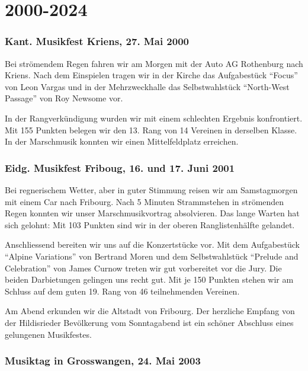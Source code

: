 \section*{2000-2024}

\begin{history}

    \subsubsection*{Kant. Musikfest Kriens, 27. Mai 2000}

    Bei strömendem Regen fahren wir am Morgen mit der Auto AG Rothenburg nach
    Kriens. Nach dem Einspielen tragen wir in der Kirche das Aufgabestück
    \enquote{Focus} von Leon Vargas und in der Mehrzweckhalle das
    Selbstwahlstück \enquote{North-West Passage} von Roy Newsome vor.

    In der Rangverkündigung wurden wir mit einem schlechten Ergebnis
    konfrontiert. Mit 155 Punkten belegen wir den 13. Rang von 14 Vereinen in
    derselben Klasse. In der Marschmusik konnten wir einen Mittelfeldplatz
    erreichen.


    \subsubsection*{Eidg. Musikfest Friboug, 16. und 17. Juni 2001}

    Bei regnerischem Wetter, aber in guter Stimmung reisen wir am Samstagmorgen
    mit einem Car nach Fribourg. Nach 5 Minuten Strammstehen in strömenden Regen
    konnten wir unser Marschmusikvortrag absolvieren. Das lange Warten hat sich
    gelohnt: Mit 103 Punkten sind wir in der oberen Ranglistenhälfte gelandet.

    Anschliessend bereiten wir uns auf die Konzertstücke vor. Mit dem
    Aufgabestück \enquote{Alpine Variations} von Bertrand Moren und dem
    Selbstwahlstück \enquote{Prelude and Celebration} von James Curnow treten
    wir gut vorbereitet vor die Jury. Die beiden Darbietungen gelingen uns recht
    gut. Mit je 150 Punkten stehen wir am Schluss auf dem guten 19. Rang von 46
    teilnehmenden Vereinen.

    Am Abend erkunden wir die Altstadt von Fribourg. Der herzliche Empfang von
    der Hildisrieder Bevölkerung vom Sonntagabend ist ein schöner Abschluss
    eines gelungenen Musikfestes.


    \subsubsection*{Musiktag in Grosswangen, 24. Mai 2003}


\end{history}
